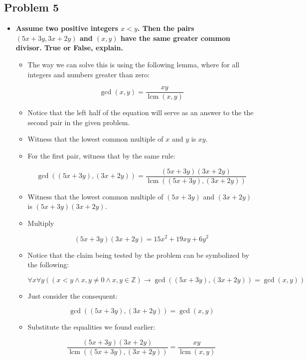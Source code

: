 \documentclass[11pt]{article}
\DeclareMathOperator{\lcm}{lcm}
\begin{document}
\subsection*{Problem 5}

\begin{itemize}
\item \textbf{Assume two positive integers $x < y$. Then the pairs
  $(5x+3y,3x+2y)$ and $(x,y)$ have the same greater common
  divisor. True or False, explain.}

\begin{itemize}

\item The way we can solve this is using the following lemma, where for
all integers and numbers greater than zero:

$$ \gcd(x, y) = \frac{xy}{\lcm(x, y)} $$

\item Notice that the left half of the equation will serve as an answer
to the the second pair in the given problem. 

\item Witness that the lowest common multiple of $x$ and $y$ is $xy$.

\item For the first pair, witness that by the same rule:

$$ \gcd((5x+3y), (3x+2y)) = \frac{(5x+3y)(3x+2y)}{\lcm((5x+3y), (3x+2y))} $$

\item Witness that the lowest common multiple of $(5x+3y)$ and $(3x+2y)$ is $(5x+3y)(3x+2y)$.

\item Multiply

$$(5x+3y)(3x+2y) = 15x^2 + 19xy + 6y^2$$

\item Notice that the claim being tested by the problem can be symbolized
by the following:

$$ \forall x \forall y ((x < y \land x,y \ne 0 \land x,y \in \mathbb{Z}) \to  \gcd((5x+3y), (3x+2y)) = \gcd(x, y)) $$

\item Just consider the consequent:

$$ \gcd((5x+3y), (3x+2y)) = \gcd(x, y) $$

\item Substitute the equalities we found earlier:

$$ \frac{(5x+3y)(3x+2y)}{\lcm((5x+3y), (3x+2y))} = \frac{xy}{\lcm(x, y)} $$


\end{itemize}
\end{itemize}
\end{document}
